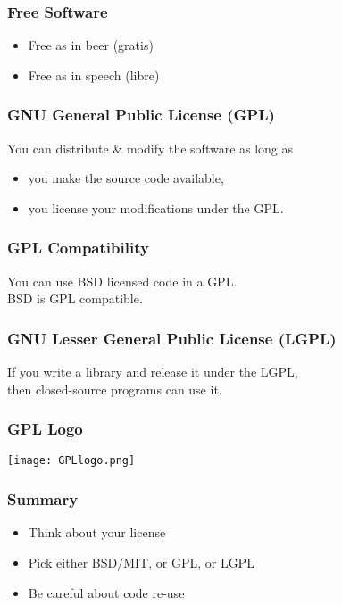 \begin{frame}[fragile]
\frametitle{Free Software}

\begin{itemize}
\item Free as in beer (gratis)
\item Free as in speech (libre)
\end{itemize}

%
\end{frame}

\begin{frame}[fragile]
\frametitle{GNU General Public License (GPL)}

You can distribute \& modify the software as long as
\begin{itemize}
\item you make the source code available,
\item you license your modifications under the GPL.
\end{itemize}

\end{frame}

\begin{frame}[fragile]
\frametitle{GPL Compatibility}

You can use BSD licensed code in a GPL.\\
BSD is \alert{GPL compatible}.

\end{frame}

\begin{frame}[fragile]
\frametitle{GNU Lesser General Public License (LGPL)}

If you write a library and release it under the LGPL,\\
then closed-source programs can use it.

\end{frame}

\begin{frame}[fragile]
\frametitle{GPL Logo}

\centering
\texttt{[image: GPLlogo.png]}

\end{frame}

\begin{frame}[fragile]
\frametitle{Summary}

\begin{itemize}
\item Think about your license
\item Pick either BSD/MIT, or GPL, or LGPL
\item Be careful about code re-use
\end{itemize}
\end{frame}

